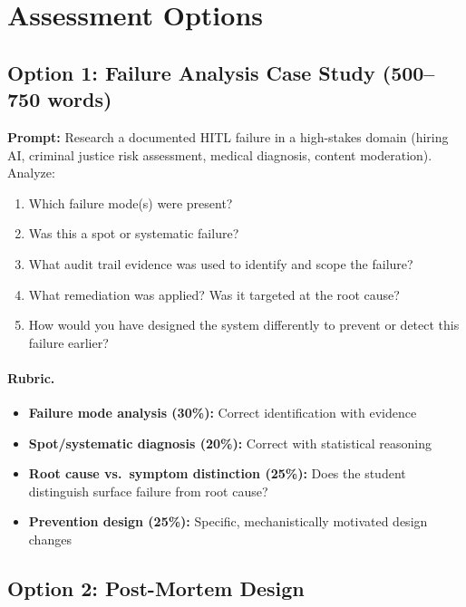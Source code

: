 \section{Assessment Options}

\subsection{Option 1: Failure Analysis Case Study (500--750 words)}

\textbf{Prompt:} Research a documented HITL failure in a high-stakes domain (hiring AI, criminal justice risk assessment, medical diagnosis, content moderation). Analyze:
\begin{enumerate}
    \item Which failure mode(s) were present?
    \item Was this a spot or systematic failure?
    \item What audit trail evidence was used to identify and scope the failure?
    \item What remediation was applied? Was it targeted at the root cause?
    \item How would you have designed the system differently to prevent or detect this failure earlier?
\end{enumerate}

\paragraph{Rubric.}
\begin{itemize}
    \item \textbf{Failure mode analysis (30\%):} Correct identification with evidence
    \item \textbf{Spot/systematic diagnosis (20\%):} Correct with statistical reasoning
    \item \textbf{Root cause vs.\ symptom distinction (25\%):} Does the student distinguish surface failure from root cause?
    \item \textbf{Prevention design (25\%):} Specific, mechanistically motivated design changes
\end{itemize}

\subsection{Option 2: Post-Mortem Design}

